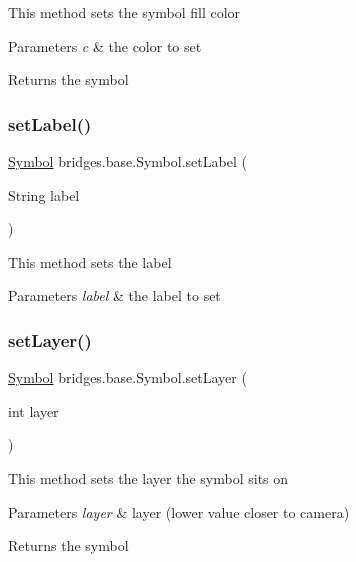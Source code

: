 This method sets the symbol fill color


\begin{DoxyParams}{Parameters}
{\em c} & the color to set \\
\hline
\end{DoxyParams}
\begin{DoxyReturn}{Returns}
the symbol 
\end{DoxyReturn}
\mbox{\label{classbridges_1_1base_1_1_symbol_a8b5aa729cfe2cc5baecf6ec0aa29ac34}} 
\subsubsection{\texorpdfstring{set\+Label()}{setLabel()}}
{\footnotesize\ttfamily \hyperlink{classbridges_1_1base_1_1_symbol}{Symbol} bridges.\+base.\+Symbol.\+set\+Label (\begin{DoxyParamCaption}\item[{String}]{label }\end{DoxyParamCaption})}

This method sets the label


\begin{DoxyParams}{Parameters}
{\em label} & the label to set \\
\hline
\end{DoxyParams}
\mbox{\label{classbridges_1_1base_1_1_symbol_ad3379aae13939c3cb8aa8b3144ea9bac}} 
\subsubsection{\texorpdfstring{set\+Layer()}{setLayer()}}
{\footnotesize\ttfamily \hyperlink{classbridges_1_1base_1_1_symbol}{Symbol} bridges.\+base.\+Symbol.\+set\+Layer (\begin{DoxyParamCaption}\item[{int}]{layer }\end{DoxyParamCaption})}

This method sets the layer the symbol sits on


\begin{DoxyParams}{Parameters}
{\em layer} & layer (lower value closer to camera) \\
\hline
\end{DoxyParams}
\begin{DoxyReturn}{Returns}
the symbol 
\end{DoxyReturn}
\mbox{\label{classbridges_1_1base_1_1_symbol_abac237b439448cbef3744817d14061c5}} 
